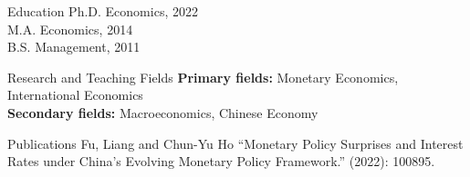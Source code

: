 \documentclass{resume_liang} %
\begin{document}
\begin{rSection}{Education}
Ph.D. Economics, {\bf \href{https://www.albany.edu/economics}{\color{black}{University at Albany, SUNY}}}  \hfill {2022} 
\vspace{0.1cm} \\             
M.A. Economics, {\bf \href{http://en.cufe.edu.cn/}{\color{black}{Central University of Finance and Economics}}} \hfill {2014} 
\vspace{0.1cm} \\
B.S. Management, {\bf \href{https://english.qdu.edu.cn/}{\color{black}{Qingdao University}}} \hfill {2011} 
\vspace{0.1cm} \\
\end{rSection}
\bigskip  




\begin{rSection}{Research and Teaching Fields}
{\bf Primary fields:} Monetary Economics, International Economics 
\vspace{0.1cm} \\ 
{\bf Secondary fields:} Macroeconomics, Chinese Economy 
\vspace{0.1cm} \\ 
\end{rSection}
\bigskip  




\begin{rSection}{Publications}
Fu, Liang and Chun-Yu Ho ``Monetary Policy Surprises and Interest Rates under China's Evolving Monetary Policy Framework.'' \textit{} (2022): 100895.
\vspace{0.1cm} \\
\end{rSection}
\bigskip  
\end{document}
